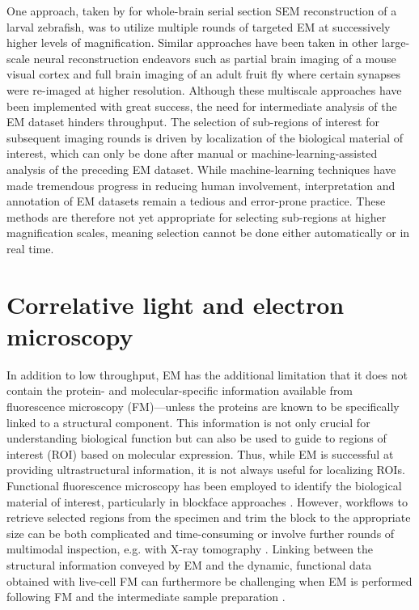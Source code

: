 One approach, taken by \textcite{hildebrand2017whole} for whole-brain serial section SEM reconstruction of a larval zebrafish, was to utilize multiple rounds of targeted EM at successively higher levels of magnification. Similar approaches have been taken in other large-scale neural reconstruction endeavors such as partial brain imaging of a mouse visual cortex \cite{bock2011network} and full brain imaging of an adult fruit fly \cite{zheng2018complete} where certain synapses were re-imaged at higher resolution. Although these multiscale approaches have been implemented with great success, the need for intermediate analysis of the EM dataset hinders throughput. The selection of sub-regions of interest for subsequent imaging rounds is driven by localization of the biological material of interest, which can only be done after manual or machine-learning-assisted analysis of the preceding EM dataset. While machine-learning techniques have made tremendous progress in reducing human involvement, interpretation and annotation of EM datasets remain a tedious and error-prone practice. These methods are therefore not yet appropriate for selecting sub-regions at higher magnification scales, meaning selection cannot be done either automatically or in real time.


\section{Correlative light and electron microscopy}
\label{sec:1_CLEM}

In addition to low throughput, EM has the additional limitation that it does not contain the protein- and molecular-specific information available from fluorescence microscopy (FM)---unless the proteins are known to be specifically linked to a structural component. This information is not only crucial for understanding biological function but can also be used to guide to regions of interest (ROI) based on molecular expression. Thus, while EM is successful at providing ultrastructural information, it is not always useful for localizing ROIs. Functional fluorescence microscopy has been employed to identify the biological material of interest, particularly in blockface approaches \cite{karreman2016fast}. However, workflows to retrieve selected regions from the specimen and trim the block to the appropriate size can be both complicated and time-consuming or involve further rounds of multimodal inspection, e.g. with X-ray tomography \cite{karreman2016intravital}. Linking between the structural information conveyed by EM and the dynamic, functional data obtained with live-cell FM can furthermore be challenging when EM is performed following FM and the intermediate sample preparation \cite{de2015correlated}.

